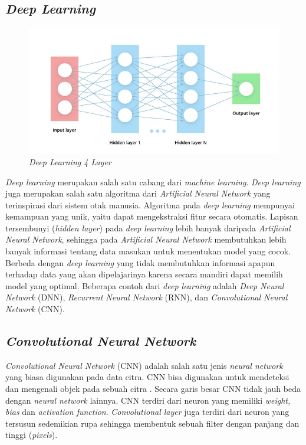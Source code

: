 \subsection{\emph{Deep Learning}}

\begin{figure} [ht] \centering
  \includegraphics[scale=0.75]{gambar/deep-learning.jpg}
  \caption{\emph{Deep Learning 4 Layer} \cite{GambarDeepLearning}}
  \label{fig:DeepLearning4Layer}
\end{figure}

\emph{Deep learning} merupakan salah satu cabang dari \emph{machine learning}. \emph{Deep learning} juga merupakan salah satu algoritma dari \emph{Artificial Neural Network} yang terinspirasi dari sistem otak manusia. Algoritma pada \emph{deep learning} mempunyai kemampuan yang unik, yaitu dapat mengekstraksi fitur secara otomatis. Lapisan tersembunyi (\emph{hidden layer}) pada \emph{deep learning} lebih banyak daripada \emph{Artificial Neural Network}, sehingga pada \emph{Artificial Neural Network} membutuhkan lebih banyak informasi tentang data masukan untuk menentukan model yang cocok. Berbeda dengan \emph{deep learning} yang tidak membutuhkan informasi apapun terhadap data yang akan dipelajarinya karena secara mandiri dapat memilih model yang optimal. Beberapa contoh dari \emph{deep learning} adalah \emph{Deep Neural Network} (DNN), \emph{Recurrent Neural Network} (RNN), dan \emph{Convolutional Neural Network} (CNN). \cite{DeepLearningJWGPutra}

\subsection{\emph{Convolutional Neural Network}}

\emph{Convolutional Neural Network} (CNN) adalah salah satu jenis \emph{neural network} yang biasa digunakan pada data citra. CNN bisa digunakan untuk mendeteksi dan mengenali objek pada sebuah citra \cite{CNNQolbiyatulLina}. Secara garis besar CNN tidak jauh beda dengan \emph{neural network} lainnya. CNN terdiri dari neuron yang memiliki \emph{weight, bias} dan \emph{activation function}. \emph{Convolutional layer} juga terdiri dari neuron yang tersusun sedemikian rupa sehingga membentuk sebuah filter dengan panjang dan tinggi (\emph{pixels}).

